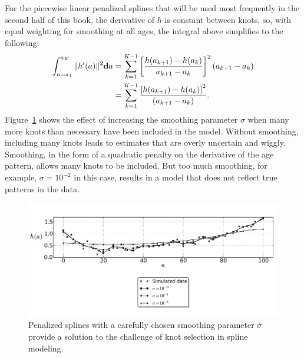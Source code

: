 For the piecewise linear penalized splines that will be used most
frequently in the second half of this book, the derivative of $h$ is
constant between knots, so, with equal weighting for smoothing at all
ages, the integral above simplifies to the following:
\begin{align*}
\int _{a=a_1} ^{a_K} \| h'(a) \|^2 \mathbf{d} a
& = \sum_{k=1} ^{K-1} \left[\frac{h(a_{k+1}) - h(a_k)}{a_{k+1}-a_k}\right]^2 (a_{k+1}-a_k)\\
&= \sum_{k=1} ^{K-1} \frac{\left[h(a_{k+1}) - h(a_k)\right]^2}{(a_{k+1}-a_k)}.
\end{align*}
Figure~\ref{smoothing-splines} shows the effect of increasing the
smoothing parameter $\sigma$ when many more knots than necessary have been included in the model.
  Without smoothing, including many knots leads to
  estimates that are overly uncertain and wiggly.  Smoothing, in the
  form of a quadratic penalty on the derivative of the age pattern,
  allows many knots to be included.  But too much smoothing, for
  example, $\sigma=10^{-2}$ in this case, results in a model that does
  not reflect true patterns in the data.

\begin{figure}[h]
\begin{center}
\includegraphics[width=\textwidth]{smoothing-splines.pdf}
\caption[Penalized splines with a carefully chosen smoothing
  parameter.]{Penalized splines with a carefully chosen smoothing parameter
  $\sigma$ provide a solution to the challenge of knot selection in
  spline modeling.}
\label{smoothing-splines}
\end{center}
\end{figure}


